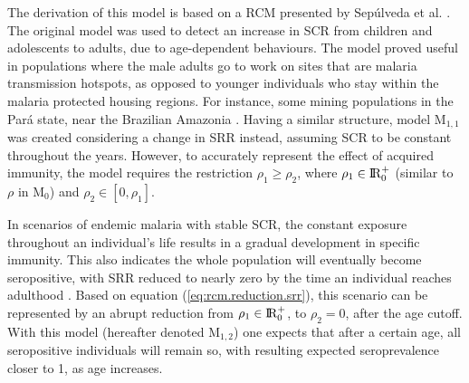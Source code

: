 The derivation of this model is based on a RCM presented by Sepúlveda et al. \cite{sepulveda2015current}.
The original model was used to detect an increase in SCR from children and adolescents to adults, due to age-dependent behaviours.
The model proved useful in populations where the male adults go to work on sites that are malaria transmission hotspots, as opposed to younger individuals who stay within the malaria protected housing regions.
For instance, some mining populations in the Pará state, near the Brazilian Amazonia \cite{cunha2014serologically}.
Having a similar structure, model M$_{1,1}$ was created considering a change in SRR instead, assuming SCR to be constant throughout the years.
However, to accurately represent the effect of acquired immunity, the model requires the restriction $\rho_1\geq\rho_2$, where $\rho_1 \in  \rm I\!R_{0}^{+}$ (similar to $\rho$ in M$_0$) and $\rho_2 \in [0,\rho_1]$.

In scenarios of endemic malaria with stable SCR, the constant exposure throughout an individual's life results in a gradual development in specific immunity.
This also indicates the whole population will eventually become seropositive, with SRR reduced to nearly zero by the time an individual reaches adulthood \cite{ondigo2014estimation}.
Based on equation (\ref{eq:rcm.reduction.srr}), this scenario can be represented by an abrupt reduction from $\rho_1 \in \rm I\!R_{0}^{+}$, to $\rho_2=0$, after the age cutoff.
With this model (hereafter denoted M$_{1,2}$) one expects that after a certain age, all seropositive individuals will remain so, with resulting expected seroprevalence closer to 1, as age increases.
\\
\\

